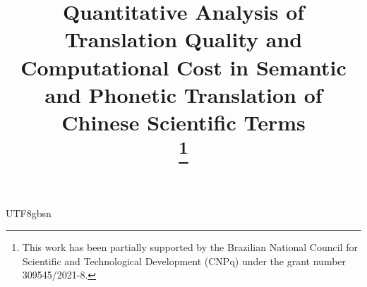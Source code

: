 \documentclass[conference]{IEEEtran}
\begin{document}
\begin{CJK*}{UTF8}{gbsn}%

\title{Quantitative Analysis of Translation Quality and Computational Cost in Semantic and Phonetic Translation of Chinese Scientific Terms\\

\thanks{This work has been partially supported by the Brazilian National Council for Scientific and Technological Development (CNPq) under the grant number 309545/2021-8.}
}

\author{
\and



}

\maketitle


\end{CJK*}
\end{document}
